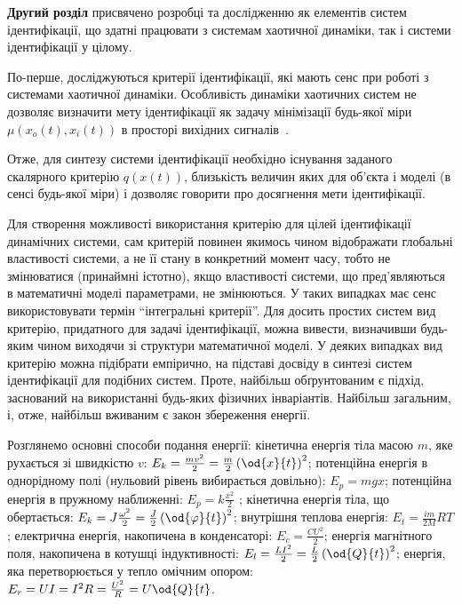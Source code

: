 \documentclass[a4paper,13pt]{atuaref}
\begin{document}
\textbf{Другий розділ}
присвячено розробці та дослідженню як елементів систем ідентифікації,
що здатні працювати з системам хаотичної динаміки, так і системи ідентифікації у цілому.

По-перше, досліджуються критерії ідентифікації,
які мають сенс при роботі з системами
хаотичної динаміки.
Особливість динаміки хаотичних систем не дозволяє визначити мету ідентифікації
як задачу мінімізації будь-якої міри
$ \mu (x_o (t), x_i (t)) $ в просторі
вихідних сигналів~\cite{atu_asau11, atu_asau12, atu_asau14}.

Отже, для синтезу системи ідентифікації необхідно існування заданого скалярного
критерію $q(x(t)) $, близькість величин яких для об'єкта і моделі (в сенсі
будь-якої міри) і дозволяє говорити про досягнення мети ідентифікації.

Для створення можливості використання критерію для цілей ідентифікації
динамічних системи, сам критерій повинен якимось чином відображати глобальні
властивості системи, а не її стану в конкретний момент часу, тобто не
змінюватися (принаймні істотно), якщо властивості системи, що пред'являються в
математичні моделі параметрами, не змінюються. У таких випадках має сенс
використовувати термін ``інтегральні критерії''.
Для досить простих систем вид критерію, придатного для задачі ідентифікації,
можна вивести, визначивши будь-яким чином виходячи зі структури математичної
моделі. У деяких випадках вид критерію можна підібрати емпірично, на
підставі досвіду в синтезі систем ідентифікації для подібних систем. Проте,
найбільш обґрунтованим є підхід, заснований на використанні будь-яких фізичних
інваріантів.
Найбільш загальним, і, отже, найбільш вживаним є закон збереження енергії.

Розглянемо основні способи подання енергії:
кінетична енергія тіла масою $m$, яке рухається зі швидкістю $v$:
$  E_k = \frac{mv^2}{2} = \frac{m}{2} \left( \od{x}{t} \right)^2$;
потенційна енергія в однорідному полі (нульовий рівень вибирається довільно):
$  E_p = m g x $;
потенційна енергія в пружному наближенні:
$  E_p = k \frac{x^2}{2}$ ;
кінетична енергія тіла, що обертається:
$  E_k = J \frac{\omega^2}{2} = \frac{J}{2} \left( \od{\varphi}{t} \right)^2 $;
внутрішня теплова енергія:
$  E_t = \frac{im}{2M} RT$;
електрична енергія, накопичена в конденсаторі:
$  E_c = \frac{C U^2}{2}$;
енергія магнітного поля, накопичена в котушці індуктивності:
$  E_l = \frac{L I^2}{2} = \frac{L}{2} \left( \od{Q}{t}\right)^2 $;
енергія, яка перетворюється у тепло омічним опором:
$  E_r = U I = I^2 R = \frac{U^2}{R} = U \od{Q}{t} $.
\end{document}
